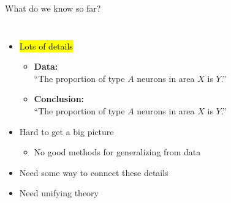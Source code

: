 \documentclass[handout,aspectratio=169]{beamer}
\begin{document}
\begin{frame}{What do we know so far?}
	\begin{columns}[T]
		\begin{itemize}
			\setlength\itemsep{0.25cm}
			\item<2-> \hl{Lots of details}
			\begin{itemize}
				\item<3-> \textbf{Data:}\\\enquote{The proportion of type $A$ neurons in area $X$ is $Y$.}\\
				\item<4-> \textbf{Conclusion:}\\\enquote{The proportion of type $A$ neurons in area $X$ is $Y$.}\\
			\end{itemize}
			\item<5-> Hard to get a big picture
			\begin{itemize}
				\item No good methods for generalizing from data
			\end{itemize}	
			\item<6-> Need some way to connect these details
			\item<7->[$\Rightarrow$] Need unifying theory
		\end{itemize}
		\vspace{0.25cm}

\end{columns}
\end{frame}
\end{document}
